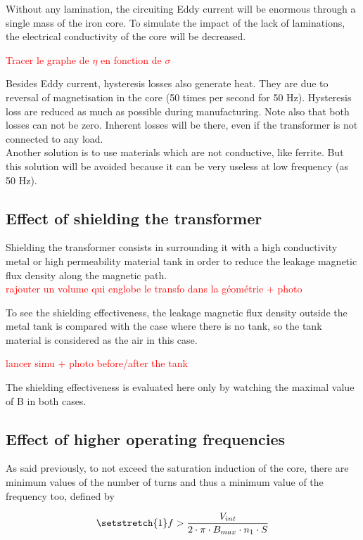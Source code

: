 \documentclass[12pt,a4paper]{report}
\begin{document}
Without any lamination, the circuiting Eddy current will be enormous through a single mass of the iron core. To simulate the impact of the lack of laminations, the electrical conductivity of the core will be decreased.

\textcolor{red}{Tracer le graphe de $\eta$ en fonction de $\sigma$}

Besides Eddy current, hysteresis losses also generate heat. They are due to reversal of magnetisation in the core (50 times per second for 50 Hz). Hysteresis loss are reduced as much as possible during manufacturing. Note also that both losses can not be zero. Inherent losses will be there, even if the transformer is not connected to any load.\\

Another solution is to use materials which are not conductive, like ferrite.
But this solution will be avoided because it can be very useless at low frequency (as 50 Hz).

\subsection{Effect of shielding the transformer}
Shielding the transformer consists in surrounding it with a high conductivity metal or high permeability material tank in order to reduce the leakage magnetic flux density along the magnetic path.\\

\textcolor{red}{rajouter un volume qui englobe le transfo dans la géométrie + photo}

To see the shielding effectiveness, the leakage magnetic flux density outside the metal tank is compared with the case where there is no tank, so the tank material is considered as the air in this case.

\textcolor{red}{lancer simu + photo before/after the tank}

The shielding effectiveness is evaluated here only by watching the maximal value of B in both cases.


\subsection{Effect of higher operating frequencies}
As said previously, to not exceed the saturation induction of the core, there are minimum values of the number of turns and thus a minimum value of the frequency too, defined by

\begin{equation}
\setstretch{1}
    f > \frac{V_{int}}{2 \cdot \pi \cdot B_{max}\cdot n_1 \cdot S}\label{eq:f_min}
\end{equation}
\end{document}
